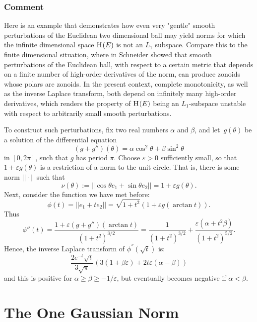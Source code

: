 \documentclass{article}[1100]
\theoremstyle{definition}
\theoremstyle{remark}
\newcommand\eps{\varepsilon}
\newcommand\norma[1]{|\!|#1|\!|}
\newcommand\mySpace[2]{\textsc{H}_{#1}(#2)}
\begin{document}
\medskip


\subsubsection*{Comment}

 Here is an example that demonstrates how even very "gentle" smooth perturbations of the Euclidean two dimensional ball may yield norms for which the infinite dimensional space $\mySpace{}{E}$ is not an $L_1$ subspace. Compare this to the finite dimensional situation, where in \cite{Schneider} Schneider showed that smooth perturbations of the Euclidean ball, with respect to a certain metric that depends on a finite number of high-order derivatives of the norm, can produce zonoids whose polars are zonoids.  In the present context, complete monotonicity, as well as the inverse Laplace transform,  both depend on infinitely many high-order derivatives, which renders the property of $\mySpace{}{E}$ being an $L_1$-subspace unstable with respect to arbitrarily small smooth perturbations.

To construct such perturbations, fix two real numbers $\alpha$ and $\beta$, and let~$g(\theta)$ be a solution of the differential equation 
\begin{equation*}\label{eq:diffeqLaplace}
(g+g'')(\theta)=\alpha\cos^2\theta+\beta\sin^2\theta
\end{equation*}
  in $[0,2\pi]$, such that $g$ has period $\pi$. Choose $\eps>0$ sufficiently small, so that
 $1+\eps g(\theta)$ is a restriction of a norm to the unit circle. That is, there is some norm $\norma{\cdot}$ such that 
 $$\nu(\theta):=\norma{\cos\theta e_1+\sin\theta e_2}=1+\eps g(\theta).$$
Next, consider the function we have met before:
\[ \phi(t)=\norma{e_1+te_2}=\sqrt{1+t^2}(1+\eps g(\arctan t)). \]
Thus
\[ \phi''(t)=\frac{1+\eps(g+g'')(\arctan t)}{(1+t^2)^{3/2}}=\frac{1}{(1+t^2)^{3/2}}+\frac{\eps(\alpha+t^2\beta)}{(1+t^2)^{5/2}}.\]
Hence, the inverse Laplace transform of $\phi^{''}(\sqrt{t})$ is:
$$\frac{2e^{-t}\sqrt{t}}{3\sqrt{\pi}}(3(1+\beta\eps)+2t\eps (\alpha-\beta))$$
and this is positive for $\alpha\geq \beta\geq -1/\eps$, but eventually becomes negative if $\alpha<\beta$. 


\section{The One Gaussian Norm}
\end{document}
